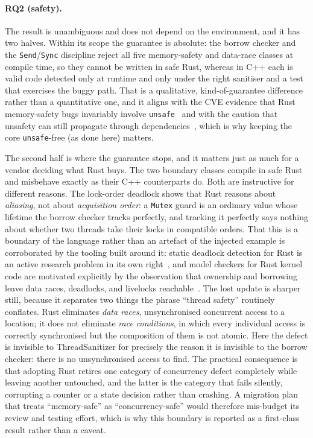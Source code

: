 \documentclass[english,twoside,openright,a4paper,censored,csm,software-track-2020]{HYthesisML}
\begin{document}
\paragraph{RQ2 (safety).} The result is unambiguous and does not depend on the environment,
and it has two halves. Within its scope the guarantee is absolute: the borrow checker and the
\texttt{Send}/\texttt{Sync} discipline reject all five memory-safety and data-race classes at
compile time, so they cannot be written in safe Rust, whereas in C++ each is valid code
detected only at runtime and only under the right sanitiser and a test that exercises the
buggy path. That is a qualitative, kind-of-guarantee difference rather than a quantitative
one, and it aligns with the CVE evidence that Rust memory-safety bugs invariably involve
\texttt{unsafe}~\cite{xu2021rustcve} and with the caution that unsafety can still propagate
through dependencies~\cite{evans2020rust}, which is why keeping the core \texttt{unsafe}-free
(as done here) matters.

The second half is where the guarantee stops, and it matters just as much for a vendor
deciding what Rust buys. The two boundary classes compile in safe Rust and misbehave exactly
as their C++ counterparts do. Both are instructive for different reasons. The lock-order
deadlock shows that Rust reasons about \emph{aliasing}, not about \emph{acquisition order}: a
\texttt{Mutex} guard is an ordinary value whose lifetime the borrow checker tracks perfectly,
and tracking it perfectly says nothing about whether two threads take their locks in
compatible orders. That this is a boundary of the language rather than an artefact of the
injected example is corroborated by the tooling built around it: static deadlock detection for
Rust is an active research problem in its own right~\cite{zhang2024deadlock}, and model
checkers for Rust kernel code are motivated explicitly by the observation that ownership and
borrowing leave data races, deadlocks, and livelocks
reachable~\cite{tang2025converos}. The lost update is sharper still, because it separates two things the
phrase ``thread safety'' routinely conflates. Rust eliminates \emph{data races}, unsynchronised
concurrent access to a location; it does not eliminate \emph{race conditions}, in which every
individual access is correctly synchronised but the composition of them is not atomic. Here
the defect is invisible to ThreadSanitizer for precisely the reason it is invisible to the
borrow checker: there is no unsynchronised access to find. The practical consequence is that
adopting Rust retires one category of concurrency defect completely while leaving another
untouched, and the latter is the category that fails silently, corrupting a counter or a state
decision rather than crashing. A migration plan that treats ``memory-safe'' as ``concurrency-safe''
would therefore mis-budget its review and testing effort, which is why this boundary is
reported as a first-class result rather than a caveat.
\end{document}
